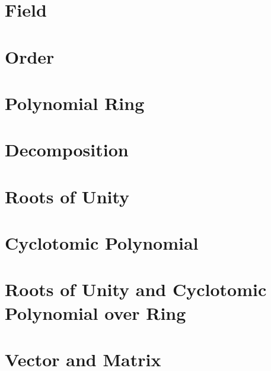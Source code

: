 \documentclass[11pt]{article}
\begin{document}
\section{Field}
\label{sec:field}


\clearpage

\section{Order}
\label{sec:order}




\clearpage

\section{Polynomial Ring}
\label{sec:polynomial-ring}


\clearpage

\section{Decomposition}
\label{sec:decomp}



\clearpage

\section{Roots of Unity}
\label{sec:roots}


\clearpage

\section{Cyclotomic Polynomial}
\label{sec:cyclotomic}


\clearpage

\section{Roots of Unity and Cyclotomic Polynomial over Ring}
\label{sec:cyclotomic-polynomial-integer-ring}


\clearpage

\section{Vector and Matrix}
\label{sec:matrix}

\end{document}
